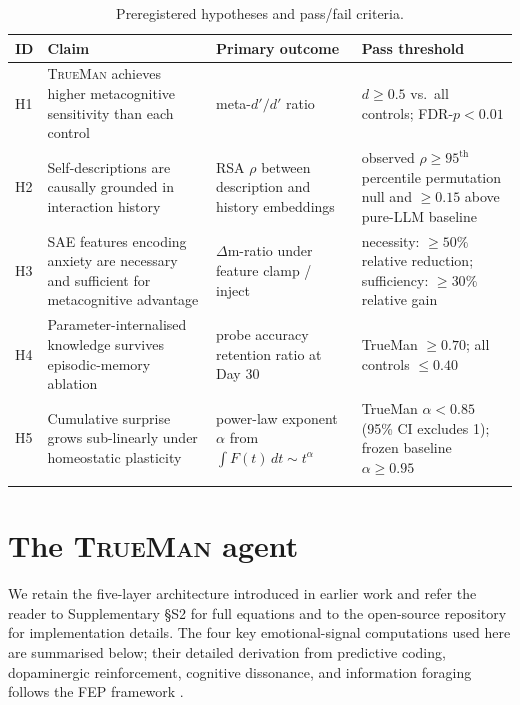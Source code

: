 \documentclass[pdflatex,sn-mathphys-num]{sn-jnl}
\newcommand{\TrueMan}{\textsc{TrueMan}}
\theoremstyle{thmstyleone}
\theoremstyle{thmstylethree}
\begin{document}
\begin{table}[h]
\caption{Preregistered hypotheses and pass/fail criteria.}\label{tab:hypotheses}
\small
\begin{tabular}{@{}p{0.4cm}p{4.5cm}p{3.8cm}p{3.5cm}@{}}
\toprule
ID & Claim & Primary outcome & Pass threshold \\
\midrule
H1 & \TrueMan{} achieves higher metacognitive sensitivity than each control & meta-$d'/d'$ ratio \cite{maniscalco2012meta} & $d \geq 0.5$ vs.\ all controls; FDR-$p < 0.01$ \\
H2 & Self-descriptions are causally grounded in interaction history & RSA $\rho$ between description and history embeddings & observed $\rho \geq 95^{\text{th}}$ percentile permutation null and $\geq 0.15$ above pure-LLM baseline \\
H3 & SAE features encoding anxiety are necessary and sufficient for metacognitive advantage & $\Delta$m-ratio under feature clamp / inject & necessity: $\geq 50\%$ relative reduction; sufficiency: $\geq 30\%$ relative gain \\
H4 & Parameter-internalised knowledge survives episodic-memory ablation & probe accuracy retention ratio at Day 30 & TrueMan $\geq 0.70$; all controls $\leq 0.40$ \\
H5 & Cumulative surprise grows sub-linearly under homeostatic plasticity & power-law exponent $\alpha$ from $\int F(t)\,dt \sim t^\alpha$ & TrueMan $\alpha < 0.85$ (95\% CI excludes 1); frozen baseline $\alpha \geq 0.95$ \\
\botrule
\end{tabular}
\end{table}

\section{The \TrueMan{} agent}\label{sec:framework}

We retain the five-layer architecture introduced in earlier work \cite{trueman_v1_arxiv} and refer the reader to Supplementary §S2 for full equations and to the open-source repository for implementation details. The four key emotional-signal computations used here are summarised below; their detailed derivation from predictive coding, dopaminergic reinforcement, cognitive dissonance, and information foraging follows the FEP framework \cite{friston2022active, colas2022autotelic, festinger1957cognitive, kawato2023metacognitive}.
\end{document}
